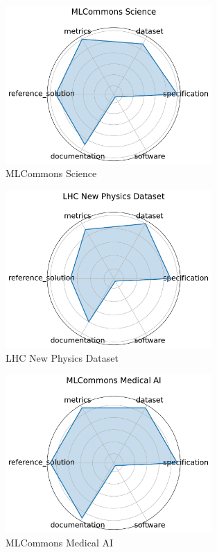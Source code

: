 \documentclass{article}
\begin{document}
\begin{figure}[h!]
  \centering
  \includegraphics[width=0.7\textwidth]{MLCommons Science_radar.pdf}
  \caption{MLCommons Science \cite{mlcommons_science2023}}
\end{figure}

\begin{figure}[h!]
  \centering
  \includegraphics[width=0.7\textwidth]{LHC New Physics Dataset_radar.pdf}
  \caption{LHC New Physics Dataset \cite{thea_aarrestad_2021_5046428}}
\end{figure}

\begin{figure}[h!]
  \centering
  \includegraphics[width=0.7\textwidth]{MLCommons Medical AI_radar.pdf}
  \caption{MLCommons Medical AI \cite{karargyris2023federated}}
\end{figure}
\end{document}
